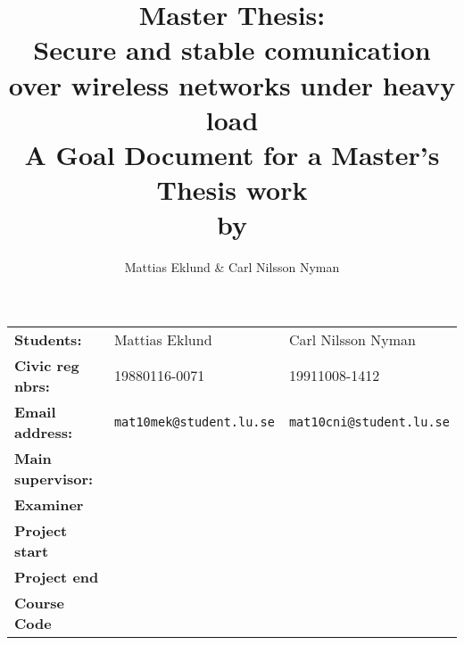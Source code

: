 \documentclass[a4paper]{article}
\title{Master Thesis:\\\Large{Secure and stable comunication over wireless
		networks under heavy load}
\\\large{A Goal Document for a Master's Thesis work\\by}}
\author{Mattias Eklund \& Carl Nilsson Nyman}
\date{}
\begin{document}
\maketitle
\pagebreak

\begin{tabular}{lll}
	\textbf{Students:} & Mattias Eklund & Carl Nilsson Nyman \\
	\textbf{Civic reg nbrs:} & 19880116-0071& 19911008-1412\\
	\textbf{Email address:} & \texttt{mat10mek@student.lu.se}
	& \texttt{mat10cni@student.lu.se} \\
	\textbf{Main supervisor:} & & \\
	\textbf{Examiner} & & \\
	\textbf{Project start} & & \\
	\textbf{Project end} & & \\
	\textbf{Course Code} & & 
\end{tabular}

%
%
%
%
\end{document}

